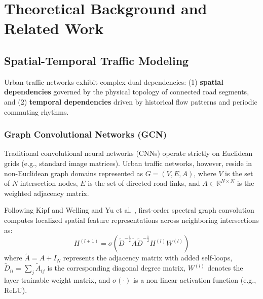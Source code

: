 \chapter{Theoretical Background and Related Work}
\label{chapter:theory}

\section{Spatial-Temporal Traffic Modeling}
Urban traffic networks exhibit complex dual dependencies: (1) \textbf{spatial dependencies} governed by the physical topology of connected road segments, and (2) \textbf{temporal dependencies} driven by historical flow patterns and periodic commuting rhythms.

\subsection{Graph Convolutional Networks (GCN)}
Traditional convolutional neural networks (CNNs) operate strictly on Euclidean grids (e.g., standard image matrices). Urban traffic networks, however, reside in non-Euclidean graph domains represented as $G = (V, E, A)$, where $V$ is the set of $N$ intersection nodes, $E$ is the set of directed road links, and $A \in \mathbb{R}^{N \times N}$ is the weighted adjacency matrix. 

Following Kipf and Welling \cite{kipf2017gcn} and Yu et al. \cite{yu2018stgcn}, first-order spectral graph convolution computes localized spatial feature representations across neighboring intersections as:
\begin{equation}
  H^{(l+1)} = \sigma \left( \tilde{D}^{-\frac{1}{2}} \tilde{A} \tilde{D}^{-\frac{1}{2}} H^{(l)} W^{(l)} \right)
\end{equation}
where $\tilde{A} = A + I_N$ represents the adjacency matrix with added self-loops, $\tilde{D}_{ii} = \sum_j \tilde{A}_{ij}$ is the corresponding diagonal degree matrix, $W^{(l)}$ denotes the layer trainable weight matrix, and $\sigma(\cdot)$ is a non-linear activation function (e.g., ReLU).

